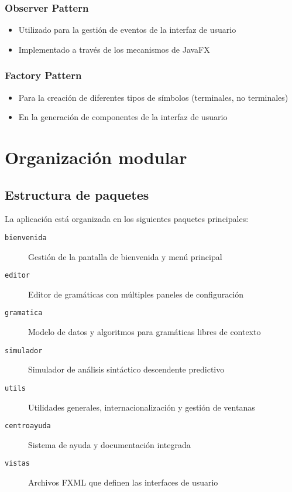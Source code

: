 \subsubsection{Observer Pattern}
\begin{itemize}
    \item Utilizado para la gestión de eventos de la interfaz de usuario
    \item Implementado a través de los mecanismos de JavaFX
\end{itemize}

\subsubsection{Factory Pattern}
\begin{itemize}
    \item Para la creación de diferentes tipos de símbolos (terminales, no terminales)
    \item En la generación de componentes de la interfaz de usuario
\end{itemize}

\section{Organización modular}

\subsection{Estructura de paquetes}

La aplicación está organizada en los siguientes paquetes principales:

\begin{description}
    \item[\texttt{bienvenida}] Gestión de la pantalla de bienvenida y menú principal
    \item[\texttt{editor}] Editor de gramáticas con múltiples paneles de configuración
    \item[\texttt{gramatica}] Modelo de datos y algoritmos para gramáticas libres de contexto
    \item[\texttt{simulador}] Simulador de análisis sintáctico descendente predictivo
    \item[\texttt{utils}] Utilidades generales, internacionalización y gestión de ventanas
    \item[\texttt{centroayuda}] Sistema de ayuda y documentación integrada
    \item[\texttt{vistas}] Archivos FXML que definen las interfaces de usuario
\end{description}

